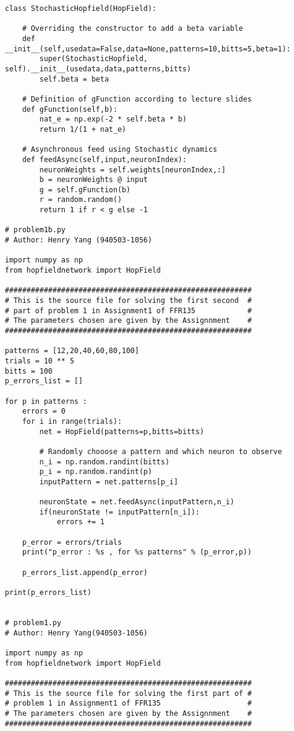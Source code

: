 \documentclass{article}
\begin{document}
\begin{verbatim}
class StochasticHopfield(HopField):

    # Overriding the constructor to add a beta variable
    def __init__(self,usedata=False,data=None,patterns=10,bitts=5,beta=1):
        super(StochasticHopfield, self).__init__(usedata,data,patterns,bitts)
        self.beta = beta
    
    # Definition of gFunction according to lecture slides
    def gFunction(self,b):
        nat_e = np.exp(-2 * self.beta * b)
        return 1/(1 + nat_e)

    # Asynchronous feed using Stochastic dynamics
    def feedAsync(self,input,neuronIndex):
        neuronWeights = self.weights[neuronIndex,:]
        b = neuronWeights @ input
        g = self.gFunction(b)
        r = random.random()
        return 1 if r < g else -1
    
# problem1b.py
# Author: Henry Yang (940503-1056)

import numpy as np
from hopfieldnetwork import HopField

#########################################################
# This is the source file for solving the first second  #
# part of problem 1 in Assignment1 of FFR135            #
# The parameters chosen are given by the Assignnment    #
#########################################################

patterns = [12,20,40,60,80,100]
trials = 10 ** 5
bitts = 100
p_errors_list = []

for p in patterns :
    errors = 0
    for i in range(trials):
        net = HopField(patterns=p,bitts=bitts)
          
        # Randomly chooose a pattern and which neuron to observe
        n_i = np.random.randint(bitts)
        p_i = np.random.randint(p)
        inputPattern = net.patterns[p_i]
        
        neuronState = net.feedAsync(inputPattern,n_i)
        if(neuronState != inputPattern[n_i]):
            errors += 1
    
    p_error = errors/trials
    print("p_error : %s , for %s patterns" % (p_error,p))

    p_errors_list.append(p_error)

print(p_errors_list)

        
# problem1.py
# Author: Henry Yang(940503-1056)

import numpy as np
from hopfieldnetwork import HopField

#########################################################
# This is the source file for solving the first part of #
# problem 1 in Assignment1 of FFR135                    #
# The parameters chosen are given by the Assignnment    #
#########################################################


\end{verbatim}
\end{document}
